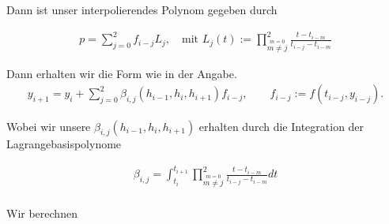 \begin{solution}
Dann ist unser interpolierendes Polynom gegeben durch

\begin{align*}
  p = \sum_{j=0}^2 f_{i-j}L_j, \quad \text{mit } L_j(t) := \prod_{\stackrel{m = 0}{m \neq j}}^{2}
  \frac{t - t_{i - m}}{t_{i - j} - t_{i - m}}
\end{align*}

Dann erhalten wir die Form wie in der Angabe.
\begin{align*}
  y_{i+1} = y_i + \sum_{j=0}^2 \beta_{i,j}(h_{i-1},h_i,h_{i+1})f_{i-j},
  \qquad f_{i-j} := f(t_{i-j},y_{i-j}).
\end{align*}


Wobei wir unsere $\beta_{i,j}(h_{i-1},h_i,h_{i+1})$ erhalten durch die Integration der Lagrangebasispolynome

\begin{align*}
  \beta_{i,j} = \int_{t_{i}}^{t_{i + 1}} \prod_{\stackrel{m = 0}{m \neq j}}^{2}
  \frac{t - t_{i - m}}{t_{i - j} - t_{i - m}}dt \\
\end{align*}

Wir berechnen


\end{solution}
